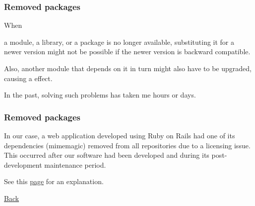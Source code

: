 \documentclass[11pt,aspectratio=43,ignorenonframetext,t]{beamer}
\begin{document}
\begin{frame}

\frametitle{Removed packages}

\hypertarget{slide:removedpkgs}{When} a module, a library, or a package is no longer available, substituting it for a newer version might not be possible if the newer version is {} backward compatible.
\vs

Also, another module that depends on it in turn might also have to be upgraded, causing a {} effect.
\vs

In the past, solving such problems has taken me hours or days.

\end{frame}


\begin{frame}

\frametitle{Removed packages}

In our case, a web application developed using Ruby on Rails had one of its dependencies (mimemagic) removed from all repositories due to a licensing issue.  This occurred after our software had been developed and during its post-development maintenance period.
\vs

See this \href{https://dev.to/cseeman/what-s-up-with-mimemagic-breaking-everything-he1}{page} for an explanation.
\vspace{3cm}

{\hfill}{\hyperlink{slide:dependencies}{Back}}

\end{frame}


\end{document}
